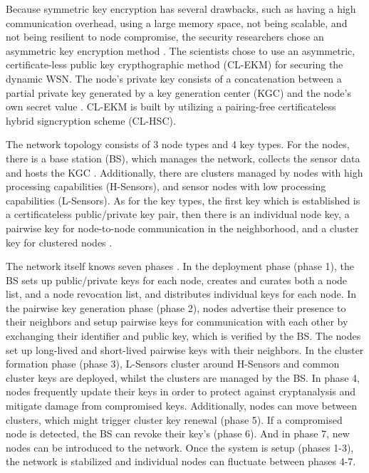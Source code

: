 \documentclass[12pt,a4paper,twoside]{report}
\begin{document}
Because symmetric key encryption has several drawbacks, such as having a high communication overhead, using a large memory space, not being scalable, and not being resilient to node compromise, the security researchers chose an asymmetric key encryption method \cite{seo;etal:2015}. The scientists chose to use an asymmetric, certificate-less public key crypthographic method (CL-EKM) for securing the dynamic WSN. The node's private key consists of a concatenation between a partial private key generated by a key generation center (KGC) and the node's own secret value \cite{seo;etal:2015}. CL-EKM is built by utilizing a pairing-free certificateless hybrid signcryption scheme (CL-HSC). \par
The network topology consists of 3 node types and 4 key types. For the nodes, there is a base station (BS), which manages the network, collects the sensor data and hosts the KGC \cite{seo;etal:2015}. Additionally, there are clusters managed by nodes with high processing capabilities (H-Sensors), and sensor nodes with low processing capabilities (L-Sensors). As for the key types, the first key which is established is a certificateless public/private key pair, then there is an individual node key, a pairwise key for node-to-node communication in the neighborhood, and a cluster key for clustered nodes \cite{seo;etal:2015}. \par
The network itself knows seven phases \cite{seo;etal:2015}. In the deployment phase (phase 1), the BS sets up public/private keys for each node, creates and curates both a node list, and a node revocation list, and distributes individual keys for each node. In the pairwise key generation phase (phase 2), nodes advertise their presence to their neighbors and setup pairwise keys for communication with each other by exchanging their identifier and public key, which is verified by the BS. The nodes set up long-lived and short-lived pairwise keys with their neighbors. In the cluster formation phase (phase 3), L-Sensors cluster around H-Sensors and common cluster keys are deployed, whilst the clusters are managed by the BS. In phase 4, nodes frequently update their keys in order to protect against cryptanalysis and mitigate damage from compromised keys. Additionally, nodes can move between clusters, which might trigger cluster key renewal (phase 5). If a compromised node is detected, the BS can revoke their key's (phase 6). And in phase 7, new nodes can be introduced to the network. Once the system is setup (phases 1-3), the network is stabilized and individual nodes can fluctuate between phases 4-7. \par
\end{document}

